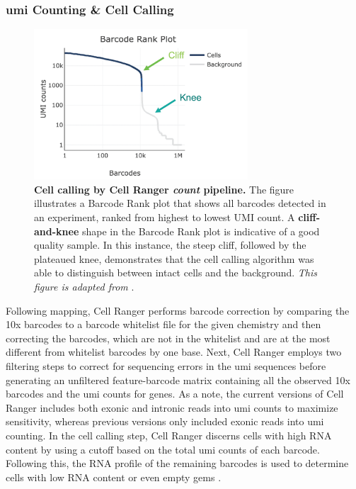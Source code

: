 \subsubsection{\gls{umi} Counting \& Cell Calling}
\begin{figure}
    \centering
    \includegraphics[width=8cm]{Chapter1/Fig/F1-10-03.png}
    \caption[Cell calling by Cell Ranger \textit{count}]{\textbf{Cell calling by Cell Ranger \textit{count} pipeline.} The figure illustrates a Barcode Rank plot that shows all barcodes detected in an experiment, ranked from highest to lowest UMI count. A \textbf{cliff-and-knee} shape in the Barcode Rank plot is indicative of a good quality sample. In this instance, the steep cliff, followed by the plateaued knee, demonstrates that the cell calling algorithm was able to distinguish between intact cells and the background. \textit{This figure is adapted from }\textbf{\cite{noauthor_barcode_nodate}}.}
    \label{fig:chp1_cellcall}
\end{figure}

Following mapping, Cell Ranger performs barcode correction by comparing the 10x barcodes to a barcode whitelist file for the given chemistry and then correcting the barcodes, which are not in the whitelist and are at the most different from whitelist barcodes by one base. Next, Cell Ranger employs two filtering steps to correct for sequencing errors in the \gls{umi} sequences before generating an unfiltered feature-barcode matrix containing all the observed 10x barcodes and the \gls{umi} counts for genes. As a note, the current versions of Cell Ranger includes both exonic and intronic reads into \gls{umi} counts to maximize sensitivity, whereas previous versions only included exonic reads into \gls{umi} counting. In the cell calling step, Cell Ranger discerns cells with high RNA content by using a cutoff based on the total \gls{umi} counts of each barcode. Following this, the RNA profile of the remaining barcodes is used to determine cells with low RNA content or even empty \gls{gem}s \textbf{\cite{noauthor_cell_nodate}}.


